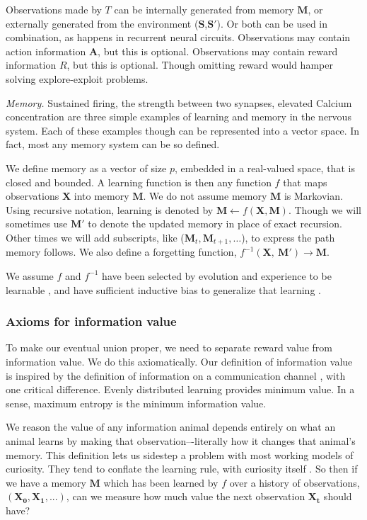 Observations made by $T$ can be internally generated from memory $\mathbf{M}$, or externally generated from the environment ($\mathbf{S}$,$\mathbf{S'}$). Or both can be used in combination, as happens in recurrent neural circuits. Observations may contain action information $\mathbf{A}$, but this is optional. Observations may contain reward information $R$, but this is optional. Though omitting reward would hamper solving explore-exploit problems. 

\emph{Memory.} Sustained firing, the strength between two synapses, elevated Calcium concentration are three simple examples of learning and memory in the nervous system. Each of these examples though can be represented into a vector space. In fact, most any memory system can be so defined. 

We define memory as a vector of size $p$, embedded in a real-valued space, that is closed and bounded. A learning function is then any function $f$ that maps observations $\mathbf{X}$ into memory $\mathbf{M}$. We do not assume memory $\mathbf{M}$ is Markovian. Using recursive notation, learning is denoted by $\mathbf{M} \leftarrow f(\mathbf{X},\mathbf{M})$. Though we will sometimes use $\mathbf{M'}$ to denote the updated memory in place of exact recursion. Other times we will add subscripts, like ($\mathbf{M}_t,\mathbf{M}_{t+1},\ldots$), to express the path memory follows. We also define a forgetting function, $f^{-1}(\mathbf{X},\ \mathbf{M}') \rightarrow \mathbf{M}$. 

We assume $f$ and $f^{-1}$ have been selected by evolution and experience to be learnable \cite{Valiant1984a,Rich2021}, and have sufficient inductive bias to generalize that learning \cite{Mitchell1980,Thrun1992a}. 


\subsubsection*{Axioms for information value} 
To make our eventual union proper, we need to separate reward value from information value. We do this axiomatically. Our definition of information value is inspired by the definition of information on a communication channel \cite{Shannon1948a}, with one critical difference. Evenly distributed learning  provides minimum value. In a sense, maximum entropy is the minimum information value.

We reason the value of any information animal depends entirely on what an animal learns by making that observation–-literally how it changes that animal's memory. This definition lets us sidestep a problem with most working models of curiosity. They tend to conflate the learning rule, with curiosity itself \cite{Schmidhuber1991b,Oudeyer2018a,Burda2018,Zhang2013,deAbril2018,Zhou2020,Schwartenbeck2019,Wilson2014a,Lehman2011,Velez2014}. So then if we have a memory $\mathbf{M}$ which has been learned by $f$ over a history of observations, $(\mathbf{X_0},\mathbf{X_1},...)$, can we measure how much value the next observation $\mathbf{X_t}$ should have? 

